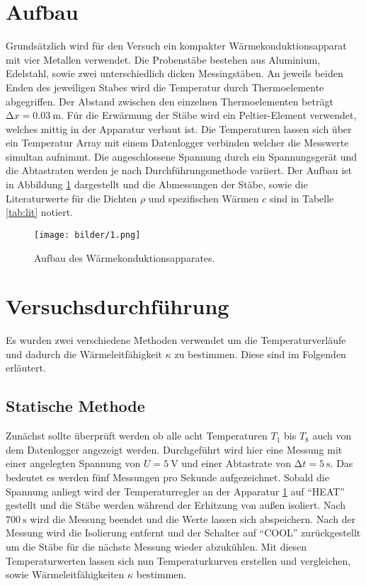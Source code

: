 \section{Aufbau}
Grundsätzlich wird für den Versuch ein kompakter Wärmekonduktionsapparat mit vier Metallen verwendet.
Die Probenstäbe bestehen aus Aluminium, Edelstahl, sowie zwei unterschiedlich dicken Messingstäben. An jeweils beiden Enden des jeweiligen Stabes wird die Temperatur durch Thermoelemente abgegriffen. Der Abstand zwischen den einzelnen Thermoelementen beträgt $\increment x = \SI{0.03}{\meter}$. Für die Erwärmung der Stäbe wird ein Peltier-Element verwendet, welches mittig in der Apparatur verbaut ist. Die Temperaturen lassen sich über ein Temperatur Array mit einem Datenlogger verbinden welcher die Messwerte simultan aufnimmt. Die angeschlossene Spannung durch ein Spannungsgerät und die Abtastraten werden je nach Durchführungsmethode variiert. Der Aufbau ist in Abbildung \ref{fig:1} dargestellt und die Abmessungen der Stäbe, sowie die Literaturwerte für die Dichten $\rho$ und spezifischen Wärmen $c$ sind in Tabelle \ref{tab:lit} notiert.

\begin{figure}
    \centering
    \texttt{[image: bilder/1.png]}
    \caption{Aufbau des Wärmekonduktionsapparates. \cite{skript}} 
    \label{fig:1}
\end{figure}
\section{Versuchsdurchführung}
Es wurden zwei verschiedene Methoden verwendet um die Temperaturverläufe und dadurch die Wärmeleitfähigkeit $\kappa$ zu bestimmen. Diese sind im Folgenden erläutert.

\subsection{Statische Methode}
Zunächst sollte überprüft werden ob alle acht Temperaturen $T_{1}$ bis $T_{8}$ auch von dem Datenlogger angezeigt werden. Durchgeführt wird hier eine Messung mit einer angelegten Spannung von $U = \SI{5}{\volt}$ und einer Abtastrate von $\increment t = \SI{5}{\second}$. Das bedeutet es werden fünf Messungen pro Sekunde aufgezeichnet. Sobald die Spannung anliegt wird der Temperaturregler an der Apparatur \ref{fig:1} auf \enquote{HEAT} gestellt und die Stäbe werden während der Erhitzung von außen isoliert. Nach $\SI{700}{\second}$ wird die Messung beendet und die Werte lassen sich abspeichern.
Nach der Messung wird die Isolierung entfernt und der Schalter auf \enquote{COOL} zurückgestellt um die Stäbe für die nächste Messung wieder abzukühlen.
Mit diesen Temperaturwerten lassen sich nun Temperaturkurven erstellen und vergleichen, sowie Wärmeleitfähigkeiten $\kappa$ bestimmen.
